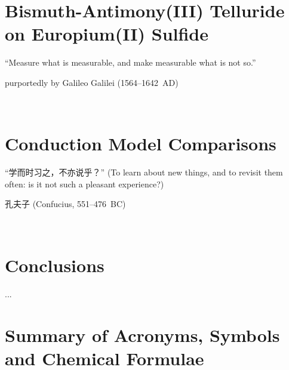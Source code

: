 ﻿\documentclass{report}
\begin{document}
\chapter{Bismuth-Antimony(III) Telluride on Europium(II) Sulfide}\label{ch:bilayer2018}
\begin{refsection}
\epigraph{``Measure what is measurable, and make measurable what is not so.''}{purportedly by Galileo Galilei (1564--1642~AD)}~\\
    
    \printbibliography[heading=subbibintoc, title=References for Chapter~\ref{ch:bilayer2018}]
\end{refsection}

\chapter{Conduction Model Comparisons}\label{ch:models}
\begin{refsection}
    \begin{CJK*}{UTF8}{gkai}
    \epigraph{``学而时习之，不亦说乎？'' (To learn about new things, and to revisit them often: is it not such a pleasant experience?)}{孔夫子 (Confucius, 551--476~BC)}~\\
    \end{CJK*}
    
    \printbibliography[heading=subbibintoc, title=References for Chapter~\ref{ch:models}]
\end{refsection}

\chapter{Conclusions}
\label{ch:conclusions}
     ...
\appendix
%
%
\chapter{Summary of Acronyms, Symbols and Chemical Formulae}
    
\end{document}
